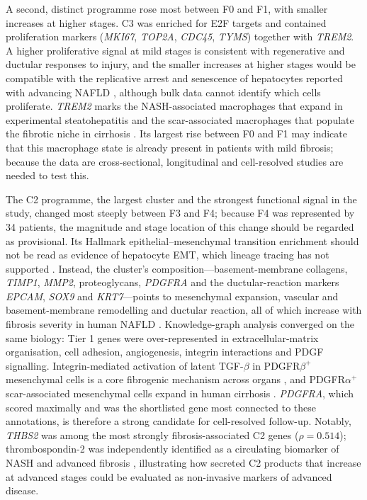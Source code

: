 \documentclass[11pt,a4paper]{article}
\begin{document}
A second, distinct programme rose most between F0 and F1, with smaller increases at higher stages. C3 was enriched for E2F targets and contained proliferation markers (\textit{MKI67}, \textit{TOP2A}, \textit{CDC45}, \textit{TYMS}) together with \textit{TREM2}. A higher proliferative signal at mild stages is consistent with regenerative and ductular responses to injury, and the smaller increases at higher stages would be compatible with the replicative arrest and senescence of hepatocytes reported with advancing NAFLD \cite{aravinthan2013}, although bulk data cannot identify which cells proliferate. \textit{TREM2} marks the NASH-associated macrophages that expand in experimental steatohepatitis \cite{xiong2019} and the scar-associated macrophages that populate the fibrotic niche in cirrhosis \cite{ramachandran2019}. Its largest rise between F0 and F1 may indicate that this macrophage state is already present in patients with mild fibrosis; because the data are cross-sectional, longitudinal and cell-resolved studies are needed to test this.

The C2 programme, the largest cluster and the strongest functional signal in the study, changed most steeply between F3 and F4; because F4 was represented by 34 patients, the magnitude and stage location of this change should be regarded as provisional. Its Hallmark epithelial--mesenchymal transition enrichment should not be read as evidence of hepatocyte EMT, which lineage tracing has not supported \cite{taura2010}. Instead, the cluster's composition---basement-membrane collagens, \textit{TIMP1}, \textit{MMP2}, proteoglycans, \textit{PDGFRA} and the ductular-reaction markers \textit{EPCAM}, \textit{SOX9} and \textit{KRT7}---points to mesenchymal expansion, vascular and basement-membrane remodelling and ductular reaction, all of which increase with fibrosis severity in human NAFLD \cite{gadd2014}. Knowledge-graph analysis converged on the same biology: Tier 1 genes were over-represented in extracellular-matrix organisation, cell adhesion, angiogenesis, integrin interactions and PDGF signalling. Integrin-mediated activation of latent TGF-$\beta$ in PDGFR$\beta^{+}$ mesenchymal cells is a core fibrogenic mechanism across organs \cite{henderson2013}, and PDGFR$\alpha^{+}$ scar-associated mesenchymal cells expand in human cirrhosis \cite{ramachandran2019}. \textit{PDGFRA}, which scored maximally and was the shortlisted gene most connected to these annotations, is therefore a strong candidate for cell-resolved follow-up. Notably, \textit{THBS2} was among the most strongly fibrosis-associated C2 genes ($\rho=0.514$); thrombospondin-2 was independently identified as a circulating biomarker of NASH and advanced fibrosis \cite{kozumi2021}, illustrating how secreted C2 products that increase at advanced stages could be evaluated as non-invasive markers of advanced disease.
\end{document}
